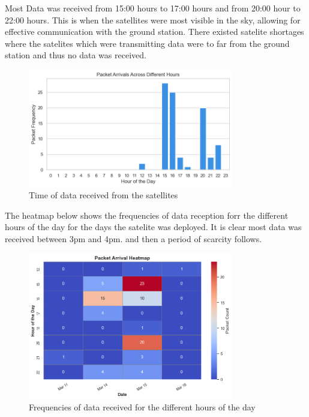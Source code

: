 \documentclass[12pt,a4paper]{article}
\begin{document}
Most Data was received from 15:00 hours to 17:00 hours and from 20:00 hour to 22:00 hours. This is when the satellites were most visible in the sky, allowing for effective communication with the ground station. There existed satelite shortages where the satelites which were transmitting data were to far from the ground station and thus no data was received.

\begin{figure}[H]
    \centering
    \includegraphics[width=0.8\textwidth]{../images/daytime.png}
    \caption{Time of data received from the satellites}
    \label{fig:time_data}
\end{figure}

The heatmap below shows the frequencies of data reception forr the different hours of the day for the days the satelite was deployed. It is clear most data was received between 3pm and 4pm. and then a period of scarcity follows.
\begin{figure}[H]
    \centering
    \includegraphics[width=0.8\textwidth]{../images/heatmap.png}
    \caption{Frequencies of data received for the different hours of the day}
    \label{fig:frequencies_data}
\end{figure}
\end{document}
